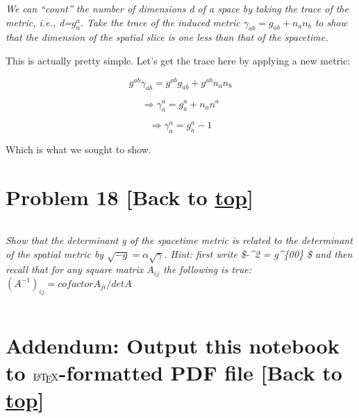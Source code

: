 \documentclass[landscape,letterpaper,10pt,english]{article}
\makeatletter
\let\Oldlatex\LaTeX
\renewcommand{\LaTeX}{\textrm{\Oldlatex}}
\newcommand{\boxspacing}{\kern\kvtcb@left@rule\kern\kvtcb@boxsep}
\newcommand{\prompt}[4]{
        {\ttfamily\llap{{\color{#2}[#3]:\hspace{3pt}#4}}\vspace{-\baselineskip}}
    }
\makeatother
\begin{document}
\[\label{P17}\]

\emph{We can ``count'' the number of dimensions d of a space by taking
the trace of the metric, i.e., d=\(g^a_a\). Take the trace of the
induced metric \(\gamma_{ab} = g_{ab} + n_a n_b\) to show that the
dimension of the spatial slice is one less than that of the spacetime.}

This is actually pretty simple. Let's get the trace here by applying a
new metric:

\[g^{ab}\gamma_{ab} = g^{ab}g_{ab} + g^{ab}n_a n_b\]

\[ \Rightarrow \gamma^a_a= g^a_a + n_a n^a\]

\[ \Rightarrow \gamma^a_a= g^a_a -1\]

Which is what we sought to show.

    \hypertarget{problem-18-back-to-top}{%
\section{\texorpdfstring{Problem 18 {[}Back to
\hyperref[toc]{top}{]}}{Problem 18 {[}Back to {]}}}\label{problem-18-back-to-top}}

\[\label{P18}\]

\emph{Show that the determinant g of the spacetime metric is related to
the determinant of the spatial metric by
\(\sqrt{-g} = \alpha \sqrt{\gamma}\). Hint: first write \$-\alpha\^{}2 =
g\^{}\{00\} \$ and then recall that for any square matrix \(A_{ij}\) the
following is true: \((A^{-1})_{ij} = cofactorA_{ji}/detA\)}

    \begin{tcolorbox}[breakable, size=fbox, boxrule=1pt, pad at break*=1mm,colback=cellbackground, colframe=cellborder]
\prompt{In}{incolor}{ }{\boxspacing}
\begin{Verbatim}[commandchars=\\\{\}]

\end{Verbatim}
\end{tcolorbox}

    \hypertarget{addendum-output-this-notebook-to-latex-formatted-pdf-file-back-to-top}{%
\section{\texorpdfstring{Addendum: Output this notebook to
\(\LaTeX\)-formatted PDF file {[}Back to
\hyperref[toc]{top}{]}}{Addendum: Output this notebook to \textbackslash LaTeX-formatted PDF file {[}Back to {]}}}\label{addendum-output-this-notebook-to-latex-formatted-pdf-file-back-to-top}}
\end{document}

